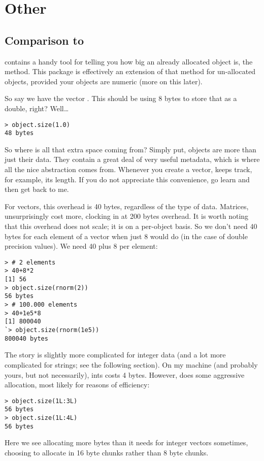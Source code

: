 \section{Other}

\subsection{Comparison to }

 contains a handy tool for telling you how big an already allocated object is, the  method.  This package is effectively an extension of that method for un-allocated objects, provided your objects are numeric (more on this later).

So say we have the vector .  This should be using 8 bytes to store that  as a double, right?  Well\dots
\begin{lstlisting}[language=rr]
> object.size(1.0)
48 bytes
\end{lstlisting}

So where is all that extra space coming from?  Simply put,  objects are more than just their data.  They contain a great deal of very useful metadata, which is where all the nice abstraction comes from.  Whenever you create a vector,  keeps track, for example, its length.  If you do not appreciate this convenience, go learn  and then get back to me.  

For vectors, this overhead is 40 bytes, regardless of the type of data.  Matrices, unsurprisingly cost more, clocking in at 200 bytes overhead.  It is worth noting that this overhead does not scale; it is on a per-object basis.  So we don't need 40 bytes for each element of a vector when just 8 would do (in the case of double precision values).  We need 40 plus 8 per element:
\begin{lstlisting}[language=rr]
> # 2 elements
> 40+8*2
[1] 56
> object.size(rnorm(2))
56 bytes
> # 100.000 elements
> 40+1e5*8
[1] 800040
`> object.size(rnorm(1e5))
800040 bytes
\end{lstlisting}

The story is slightly more complicated for integer data (and a lot more complicated for strings; see the following section).  On my machine (and probably yours, but not necessarily), ints costs 4 bytes.  However,  does some aggressive allocation, most likely for reasons of efficiency:
\begin{lstlisting}[language=rr]
> object.size(1L:3L)
56 bytes
> object.size(1L:4L)
56 bytes
\end{lstlisting}
Here we see  allocating more bytes than it needs for integer vectors sometimes, choosing to allocate in 16 byte chunks rather than 8 byte chunks.

